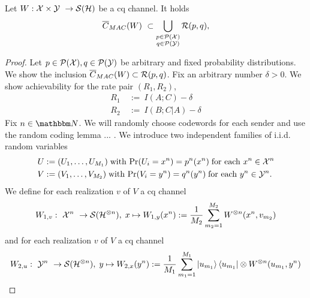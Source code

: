 \begin{proposition}
Let $W: {\mathcal X} \times {\mathcal Y} \ \rightarrow {\mathcal S}({\mathcal H})$ be a cq channel. It holds
\begin{align}
\overline{C}_{MAC}(W) \ \subset \bigcup_{\substack{p \in {\mathcal P}({\mathcal X})\\q \in {\mathcal P}({\mathcal Y})}} {\mathcal R}(p,q),
\end{align}
\end{proposition}
\begin{proof}
Let $p \in {\mathcal P}({\mathcal X}), q \in {\mathcal P}({\mathcal Y})$ be arbitrary and fixed probability distributions. We show the inclusion $\overline{C}_{MAC}(W) \subset {\mathcal R}(p,q)$. \newline 
Fix an arbitrary number $\delta > 0$. We show achievability for the rate pair $(R_1, R_2)$,
\begin{align}
 R_1 \ &:= \ I(A;C) - \delta  \\
 R_2 \ &:= \ I(B;C|A) - \delta
\end{align} 
Fix $n \in \bbmN$. We will randomly choose codewords for each sender and use the random coding lemma ... . 
We introduce two independent families of i.i.d. random variables 
\begin{align}
 U &:= (U_1,\dots, U_{M_1}) \; \text{with} \ \mathrm{Pr}(U_i = x^n) = p^n(x^n) \; \text{for each} \ x^n \in {\mathcal X}^n \\
 V &:= (V_1,\dots, V_{M_2}) \; \text{with} \ \mathrm{Pr}(V_{i} = y^n) = q^n(y^n) \; \text{for each} \ y^n \in {\mathcal Y}^n. \\
\end{align}
We define for each realization $v$ of $V$ a cq channel
\begin{align}
W_{1,v}: \ {\mathcal X}^n \ \rightarrow {\mathcal S}({\mathcal H}^{\otimes n}), \; x \mapsto W_{1,y}(x^n) := \frac{1}{M_2} \sum_{m_2=1}^{M_2} W^{\otimes n}(x^n, v_{m_2})
\end{align}
and for each realization $v$ of $V$ a cq channel 
\begin{align}
W_{2,u}: \ {\mathcal Y}^n \ \rightarrow {\mathcal S}({\mathcal H}^{\otimes n}), \; y \mapsto W_{2,x}(y^n) := \frac{1}{M_1}\sum_{m_1=1}^{M_1}  \ket{u_{m_1}}\bra{u_{m_1}} \otimes  W^{\otimes n}(u_{m_1}, y^n)
\end{align}


\end{proof}


